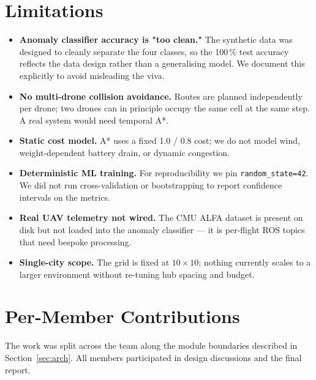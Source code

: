 \documentclass[11pt,a4paper]{article}
\begin{document}
\section{Limitations}
\label{sec:limits}

\begin{itemize}[leftmargin=*]
  \item \textbf{Anomaly classifier accuracy is "too clean."} The
        synthetic data was designed to cleanly separate the four classes,
        so the 100\,\% test accuracy reflects the data design rather than
        a generalising model. We document this explicitly to avoid
        misleading the viva.
  \item \textbf{No multi-drone collision avoidance.} Routes are planned
        independently per drone; two drones can in principle occupy the
        same cell at the same step. A real system would need temporal A*.
  \item \textbf{Static cost model.} A* uses a fixed 1.0 / 0.8 cost; we do
        not model wind, weight-dependent battery drain, or dynamic
        congestion.
  \item \textbf{Deterministic ML training.} For reproducibility we pin
        \texttt{random\_state=42}. We did not run cross-validation or
        bootstrapping to report confidence intervals on the metrics.
  \item \textbf{Real UAV telemetry not wired.} The CMU ALFA dataset is
        present on disk but not loaded into the anomaly classifier --- it
        is per-flight ROS topics that need bespoke processing.
  \item \textbf{Single-city scope.} The grid is fixed at $10\!\times\!10$;
        nothing currently scales to a larger environment without
        re-tuning hub spacing and budget.
\end{itemize}

\section{Per-Member Contributions}
\label{sec:contrib}

The work was split across the team along the module boundaries described
in Section~\ref{sec:arch}. All members participated in design discussions
and the final report.
\end{document}
